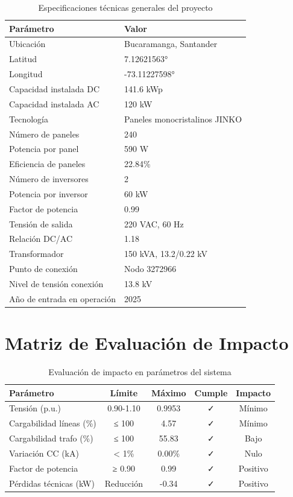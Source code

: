 \begin{table}[H]
    \centering
    \caption{Especificaciones técnicas generales del proyecto}
    \begin{tabular}{ll}
    \toprule
    \textbf{Parámetro} & \textbf{Valor} \\
    \midrule
    Ubicación & Bucaramanga, Santander \\
    Latitud & 7.12621563° \\
    Longitud & -73.11227598° \\
    Capacidad instalada DC & 141.6 kWp \\
    Capacidad instalada AC & 120 kW \\
    Tecnología & Paneles monocristalinos JINKO \\
    Número de paneles & 240 \\
    Potencia por panel & 590 W \\
    Eficiencia de paneles & 22.84\% \\
    Número de inversores & 2 \\
    Potencia por inversor & 60 kW \\
    Factor de potencia & 0.99 \\
    Tensión de salida & 220 VAC, 60 Hz \\
    Relación DC/AC & 1.18 \\
    Transformador & 150 kVA, 13.2/0.22 kV \\
    Punto de conexión & Nodo 3272966 \\
    Nivel de tensión conexión & 13.8 kV \\
    Año de entrada en operación & 2025 \\
    \bottomrule
    \end{tabular}
\end{table}

\section{Matriz de Evaluación de Impacto}

\begin{table}[H]
    \centering
    \caption{Evaluación de impacto en parámetros del sistema}
    \begin{tabular}{lcccc}
    \toprule
    \textbf{Parámetro} & \textbf{Límite} & \textbf{Máximo} & \textbf{Cumple} & \textbf{Impacto} \\
    \midrule
    Tensión (p.u.) & 0.90-1.10 & 0.9953 & ✓ & Mínimo \\
    Cargabilidad líneas (\%) & ≤ 100 & 4.57 & ✓ & Mínimo \\
    Cargabilidad trafo (\%) & ≤ 100 & 55.83 & ✓ & Bajo \\
    Variación CC (kA) & < 1\% & 0.00\% & ✓ & Nulo \\
    Factor de potencia & ≥ 0.90 & 0.99 & ✓ & Positivo \\
    Pérdidas técnicas (kW) & Reducción & -0.34 & ✓ & Positivo \\
    \bottomrule
    \end{tabular}
\end{table}

